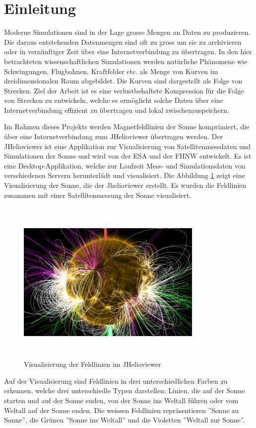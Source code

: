 \section{Einleitung}\label{einleitung}
Moderne Simulationen sind in der Lage grosse Mengen an Daten zu produzieren. Die daraus entstehenden Datenmengen sind oft zu gross um sie zu archivieren oder in vernünftiger Zeit über eine Internetverbindung zu übertragen. In den hier betrachteten wissenschaftlichen Simulationen werden natürliche Phänomene wie Schwingungen, Flugbahnen, Kraftfelder etc. als Menge von Kurven im dreidimensionalen Raum abgebildet. Die Kurven sind dargestellt als Folge von Strecken. Ziel der Arbeit ist es eine verlustbehaftete Kompression für die Folge von Strecken zu entwickeln, welche es ermöglicht solche Daten über eine Internetverbindung effizient zu übertragen und lokal zwischenzuspeichern.

Im Rahmen dieses Projekts werden Magnetfeldlinien der Sonne komprimiert, die über eine Internetverbindung zum JHelioviewer übertragen werden. Der JHelioviewer ist eine Applikation zur Visualisierung von Satellitenmessdaten und Simulationen der Sonne und wird von der ESA und der FHNW entwickelt. Es ist eine Desktop-Applikation, welche zur Laufzeit Mess- und Simulationsdaten von verschiedenen Servern herunterlädt und visualisiert. Die Abbildung \ref{einleitung::feldlinien} zeigt eine Visualisierung der Sonne, die der Jhelioviewer erstellt. Es wurden die Feldlinien zusammen mit einer Satellitenmessung der Sonne visualisiert.

\begin{figure}[!htbp]
\center
	\includegraphics[width=0.8\textwidth,height=8cm,keepaspectratio]{./pictures/einleitung/fieldLines.png}
	\caption{Visualisierung der Feldlinien im JHelioviewer}
	\label{einleitung::feldlinien}
\end{figure}
Auf der Visualisierung sind Feldlinien in drei unterschiedlichen Farben zu erkennen, welche drei unterschiedle Typen darstellen: Linien, die auf der Sonne starten und auf der Sonne enden, von der Sonne ins Weltall führen oder vom Weltall auf der Sonne enden. Die weissen Feldlinien repräsentieren ''Sonne zu Sonne'', die Grünen ''Sonne ins Weltall'' und die Violetten ''Weltall zur Sonne''.

